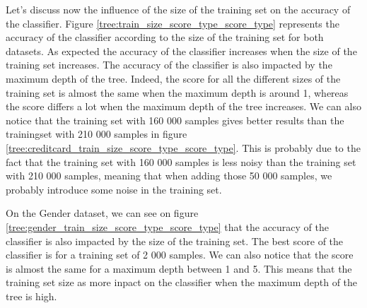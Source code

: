 \documentclass[10pt]{article}
\begin{document}
			Let's discuss now the influence of the size of the training set on the accuracy of the classifier. Figure \ref{tree:train_size_score_type_score_type} represents the accuracy of the classifier according to the size of the training set for both datasets. As expected the accuracy of the classifier increases when the size of the training set increases. The accuracy of the classifier is also impacted by the maximum depth of the tree. Indeed, the score for all the different sizes of the training set is almost the same when the maximum depth is around 1, whereas the score differs a lot when the maximum depth of the tree increases. We can also notice that the training set with 160 000 samples gives better results than the trainingset with 210 000 samples in figure \ref{tree:creditcard_train_size_score_type_score_type}. This is probably due to the fact that the training set with 160 000 samples is less noisy than the training set with 210 000 samples, meaning that when adding those 50 000 samples, we probably introduce some noise in the training set.

			On the Gender dataset, we can see on figure \ref{tree:gender_train_size_score_type_score_type} that the accuracy of the classifier is also impacted by the size of the training set. The best score of the classifier is for a training set of 2 000 samples. We can also notice that the score is almost the same for a maximum depth between 1 and 5. This means that the training set size as more inpact on the classifier when the maximum depth of the tree is high.
\end{document}
